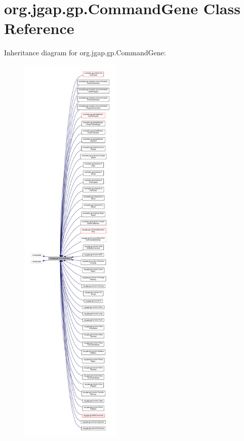 \hypertarget{classorg_1_1jgap_1_1gp_1_1_command_gene}{\section{org.\-jgap.\-gp.\-Command\-Gene Class Reference}
\label{classorg_1_1jgap_1_1gp_1_1_command_gene}
}


Inheritance diagram for org.\-jgap.\-gp.\-Command\-Gene\-:
\nopagebreak
\begin{figure}[H]
\begin{center}
\leavevmode
\includegraphics[height=550pt]{classorg_1_1jgap_1_1gp_1_1_command_gene__inherit__graph}
\end{center}
\end{figure}


